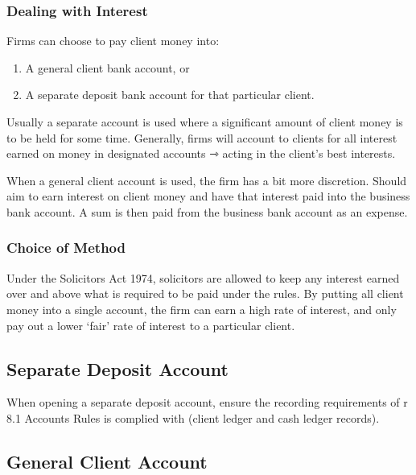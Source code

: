 \documentclass[
]{article}
\providecommand{\tightlist}{%
  \setlength{\itemsep}{0pt}\setlength{\parskip}{0pt}}
\begin{document}
\hypertarget{dealing-with-interest}{%
\subsubsection{Dealing with Interest}\label{dealing-with-interest}}

Firms can choose to pay client money into:

\begin{enumerate}
\def\labelenumi{\arabic{enumi}.}
\tightlist
\item
  A general client bank account, or
\item
  A separate deposit bank account for that particular client.
\end{enumerate}

Usually a separate account is used where a significant amount of client
money is to be held for some time. Generally, firms will account to
clients for all interest earned on money in designated accounts ⇾ acting
in the client's best interests.

When a general client account is used, the firm has a bit more
discretion. Should aim to earn interest on client money and have that
interest paid into the business bank account. A sum is then paid from
the business bank account as an expense.

\hypertarget{choice-of-method}{%
\subsubsection{Choice of Method}\label{choice-of-method}}

Under the Solicitors Act 1974, solicitors are allowed to keep any
interest earned over and above what is required to be paid under the
rules. By putting all client money into a single account, the firm can
earn a high rate of interest, and only pay out a lower `fair' rate of
interest to a particular client.

\hypertarget{separate-deposit-account}{%
\subsection{Separate Deposit Account}\label{separate-deposit-account}}

When opening a separate deposit account, ensure the recording
requirements of r 8.1 Accounts Rules is complied with (client ledger and
cash ledger records).

\hypertarget{general-client-account}{%
\subsection{General Client Account}\label{general-client-account}}
\end{document}
